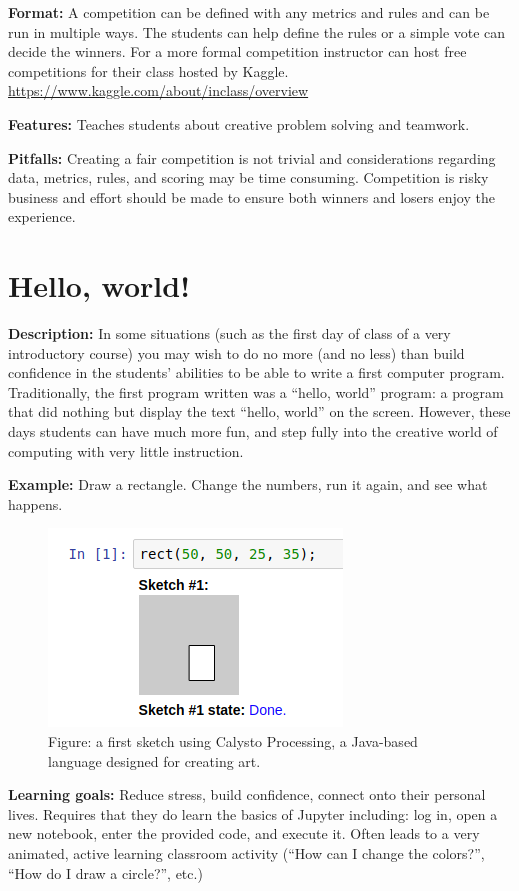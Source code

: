 \documentclass[]{book}
\begin{document}
\textbf{Format:} A competition can be defined with any metrics and rules
and can be run in multiple ways. The students can help define the rules
or a simple vote can decide the winners. For a more formal competition
instructor can host free competitions for their class hosted by Kaggle.
\url{https://www.kaggle.com/about/inclass/overview}

\textbf{Features:} Teaches students about creative problem solving and
teamwork.

\textbf{Pitfalls:} Creating a fair competition is not trivial and
considerations regarding data, metrics, rules, and scoring may be time
consuming. Competition is risky business and effort should be made to
ensure both winners and losers enjoy the experience.

\section{Hello, world!}\label{hello-world}

\textbf{Description:} In some situations (such as the first day of class
of a very introductory course) you may wish to do no more (and no less)
than build confidence in the students' abilities to be able to write a
first computer program. Traditionally, the first program written was a
``hello, world'' program: a program that did nothing but display the
text ``hello, world'' on the screen. However, these days students can
have much more fun, and step fully into the creative world of computing
with very little instruction.

\textbf{Example:} Draw a rectangle. Change the numbers, run it again,
and see what happens.

\begin{figure}
\centering
\includegraphics{images/processing.png}
\caption{Figure: a first sketch using Calysto Processing, a Java-based
language designed for creating art.}
\end{figure}

\textbf{Learning goals:} Reduce stress, build confidence, connect onto
their personal lives. Requires that they do learn the basics of Jupyter
including: log in, open a new notebook, enter the provided code, and
execute it. Often leads to a very animated, active learning classroom
activity (``How can I change the colors?'', ``How do I draw a circle?'',
etc.)
\end{document}
